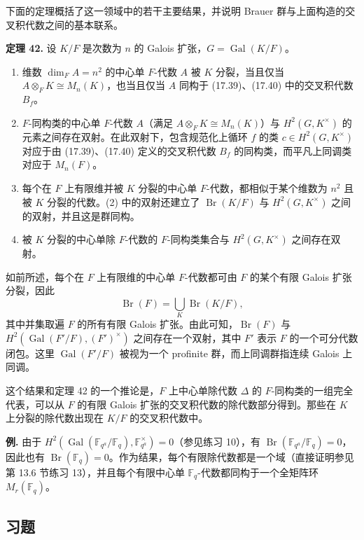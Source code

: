 下面的定理概括了这一领域中的若干主要结果，并说明 Brauer 群与上面构造的交叉积代数之间的基本联系。

\medskip
\noindent\textbf{定理 42.} 设 $K/F$ 是次数为 $n$ 的 Galois 扩张，$G=\operatorname{Gal}(K/F)$。
\begin{enumerate}[label=(\arabic*)]
  \item 维数 $\dim_F A=n^2$ 的中心单 $F$-代数 $A$ 被 $K$ 分裂，当且仅当 $A\otimes_F K\cong M_n(K)$，也当且仅当 $A$ 同构于 (17.39)、(17.40) 中的交叉积代数 $B_f$。
  \item $F$-同构类的中心单 $F$-代数 $A$（满足 $A\otimes_F K\cong M_n(K)$）与 $H^2(G,K^\times)$ 的元素之间存在双射。在此双射下，包含规范化上循环 $f$ 的类 $c\in H^2(G,K^\times)$ 对应于由 (17.39)、(17.40) 定义的交叉积代数 $B_f$ 的同构类，而平凡上同调类对应于 $M_n(F)$。
  \item 每个在 $F$ 上有限维并被 $K$ 分裂的中心单 $F$-代数，都相似于某个维数为 $n^2$ 且被 $K$ 分裂的代数。(2) 中的双射还建立了 $\operatorname{Br}(K/F)$ 与 $H^2(G,K^\times)$ 之间的双射，并且这是群同构。
  \item 被 $K$ 分裂的中心单除 $F$-代数的 $F$-同构类集合与 $H^2(G,K^\times)$ 之间存在双射。
\end{enumerate}

如前所述，每个在 $F$ 上有限维的中心单 $F$-代数都可由 $F$ 的某个有限 Galois 扩张分裂，因此
\[
  \operatorname{Br}(F)=\bigcup_K \operatorname{Br}(K/F),
\]
其中并集取遍 $F$ 的所有有限 Galois 扩张。由此可知，$\operatorname{Br}(F)$ 与 $H^2(\operatorname{Gal}(F'/F),(F')^\times)$ 之间存在一个双射，其中 $F'$ 表示 $F$ 的一个可分代数闭包。这里 $\operatorname{Gal}(F'/F)$ 被视为一个 profinite 群，而上同调群指连续 Galois 上同调。

这个结果和定理 42 的一个推论是，$F$ 上中心单除代数 $\Delta$ 的 $F$-同构类的一组完全代表，可以从 $F$ 的有限 Galois 扩张的交叉积代数的除代数部分得到。那些在 $K$ 上分裂的除代数出现在 $K/F$ 的交叉积代数中。

\noindent\textbf{例.} 由于 $H^2(\operatorname{Gal}(\mathbb F_{q^a}/\mathbb F_q),\mathbb F_{q^a}^{\times})=0$（参见练习 10），有 $\operatorname{Br}(\mathbb F_{q^a}/\mathbb F_q)=0$，因此也有 $\operatorname{Br}(\mathbb F_q)=0$。作为结果，每个有限除代数都是一个域（直接证明参见第 13.6 节练习 13），并且每个有限中心单 $\mathbb F_q$-代数都同构于一个全矩阵环 $M_r(\mathbb F_q)$。

\subsection*{习题}

